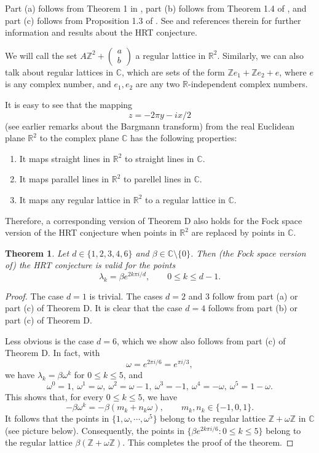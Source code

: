 \documentclass[reqno,11pt]{amsart}
\newtheorem{theorem}{Theorem}
\newcommand{\C}{\mathbb C}
\newcommand{\R}{\mathbb R}
\newcommand{\Z}{\mathbb Z}
\begin{document}
Part (a) follows from Theorem 1 in \cite{HRT1996}, part (b) follows from 
Theorem 1.4 of \cite{DZ2012}, and part (c) follows from Proposition 1.3 
of \cite{LPA1999}. See \cite{HRT1996, LDF2022, SDW2015} and references 
therein for further information and results about the HRT conjecture.

We will call the set $A\Z^2+\begin{pmatrix} a\\ b\end{pmatrix}$ a regular 
lattice in $\R^2$. Similarly, we can also talk about regular lattices in $\C$,
which are sets of the form $\Z e_1+\Z e_2+e$, where $e$ is any complex
number, and $e_1,e_2$ are any two $\R$-independent complex numbers. 

It is easy to see that the mapping
$$z=-2\pi y-ix/2$$ 
(see earlier remarks about the Bargmann transform) from the real 
Euclidean plane $\R^2$ to the complex plane $\C$ has the following properties:
\begin{enumerate}
\item[(i)] It maps straight lines in $\R^2$ to straight lines in $\C$.
\item[(ii)] It maps parallel lines in $\R^2$ to parellel lines in $\C$.
\item[(iii)] It maps any regular lattice in $\R^2$ to a regular lattice in $\C$.
\end{enumerate}
Therefore, a corresponding version of Theorem D also holds for the Fock
space version of the HRT conjecture when points in $\R^2$ are replaced
by points in $\C$.

\begin{theorem}\label{t1}
Let $d\in\{1,2,3,4,6\}$ and $\beta\in\C\setminus\{0\}$. Then (the Fock 
space version of) the HRT conjecture is valid for the points
$$\lambda_k=\beta e^{2k\pi i/d},\qquad 0\le k\le d-1.$$
\end{theorem}

\begin{proof}
The case $d=1$ is trivial. The cases $d=2$ and $3$ follow from part (a) 
or part (c) of Theorem D. It is clear that the case $d=4$ follows from 
part (b) or part (c) of Theorem D.

Less obvious is the case $d=6$, which we show also follows from 
part (c) of Theorem D. In fact, with
$$\omega=e^{2\pi i/6}=e^{\pi i/3},$$
we have $\lambda_k=\beta\omega^k$ for $0\le k\le 5$, and
$$\omega^0= 1,\ \omega^1=\omega,\ \omega^2=\omega-1,
\ \omega^3=-1,\ \omega^4=-\omega,\ \omega^5=1-\omega.$$
This shows that, for every $0\leq k\leq 5$, we have
$$-\beta\omega^k=-\beta(m_k+n_k\omega),
\qquad m_k, n_k\in\{-1,0,1\}.$$
It follows that the points in $\{1,\omega,\cdots,\omega^5\}$ belong to
the regular lattice $\Z+\omega\Z$ in $\C$ (see picture below). 
Consequently, the points in $\{\beta e^{2k\pi i/6}: 0\le k\le 5\}$ belong
to the regular lattice $\beta(\Z+\omega\Z)$. This completes the proof 
of the theorem.
\end{proof}
\end{document}
